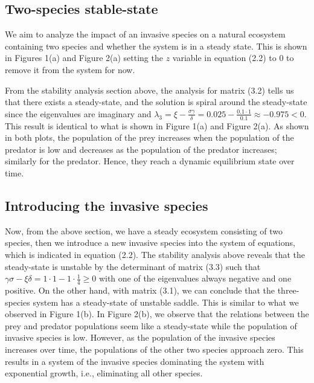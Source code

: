 \documentclass{article}
\begin{document}
\subsection*{Two-species stable-state}

\noindent We aim to analyze the impact of an invasive species on a natural ecosystem containing two species and whether the system is in a steady state. This is shown in Figures 1(a) and Figure 2(a) setting the $z$ variable in equation (2.2) to 0 to remove it from the system for now.

\vspace{5mm}

\noindent From the stability analysis section above, the analysis for matrix (3.2) tells us that there exists a steady-state, and the solution is spiral around the steady-state since the eigenvalues are imaginary and $\lambda_3 = \xi - \frac{\sigma\gamma}{\delta}=0.025-\frac{0.1\cdot1}{0.1}\approx -0.975 <0$. This result is identical to what is shown in Figure 1(a) and Figure 2(a). As shown in both plots, the population of the prey increases when the population of the predator is low and decreases as the population of the predator increases; similarly for the predator. Hence, they reach a dynamic equilibrium state over time.

\subsection*{Introducing the invasive species}

\noindent Now, from the above section, we have a steady ecosystem consisting of two species, then we introduce a new invasive species into the system of equations, which is indicated in equation (2.2). The stability analysis above reveals that the steady-state is unstable by the determinant of matrix (3.3) such that $\gamma\sigma - \xi\delta = 1\cdot 1 - 1\cdot \frac{1}{4}\ge0$ with one of the eigenvalues always negative and one positive. On the other hand, with matrix (3.1), we can conclude that the three-species system has a steady-state of unstable saddle. This is similar to what we observed in Figure 1(b). In Figure 2(b), we observe that the relations between the prey and predator populations seem like a steady-state while the population of invasive species is low. However, as the population of the invasive species increases over time, the populations of the other two species approach zero. This results in a system of the invasive species dominating the system with exponential growth, i.e., eliminating all other species. 
\end{document}
